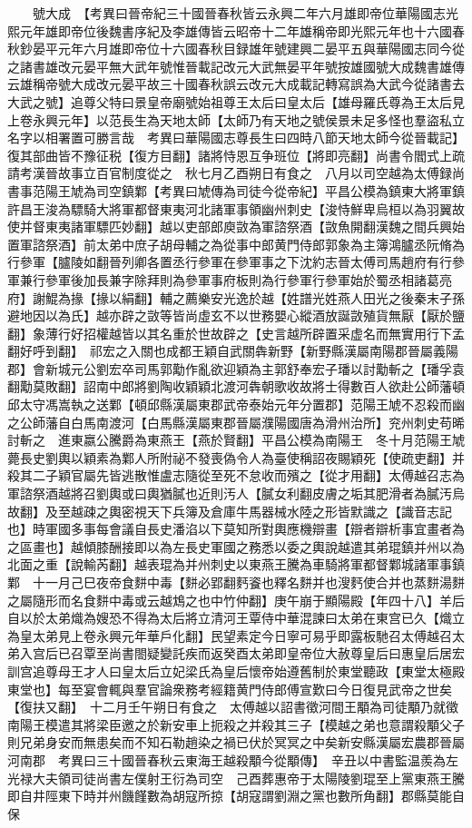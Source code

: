 　　號大成　【考異曰晉帝紀三十國晉春秋皆云永興二年六月雄即帝位華陽國志光熙元年雄即帝位後魏書序紀及李雄傳皆云昭帝十二年雄稱帝即光熙元年也十六國春秋鈔晏平元年六月雄即帝位十六國春秋目録雄年號建興二晏平五與華陽國志同今從之諸書雄改元晏平無大武年號惟晉載記改元大武無晏平年號按雄國號大成魏書雄傳云雄稱帝號大成改元晏平故三十國春秋誤云改元大成載記轉寫誤為大武今從諸書去大武之號】追尊父特曰景皇帝廟號始祖尊王太后曰皇太后【雄母羅氏尊為王太后見上卷永興元年】以范長生為天地太師【太師乃有天地之號侯景未足多怪也羣盜私立名字以相署置可勝言哉　考異曰華陽國志尊長生曰四時八節天地太師今從晉載記】復其部曲皆不豫征税【復方目翻】諸將恃恩互争班位【將即亮翻】尚書令閻式上疏請考漢晉故事立百官制度從之　秋七月乙酉朔日有食之　八月以司空越為太傅録尚書事范陽王虓為司空鎮鄴【考異曰虓傳為司徒今從帝紀】平昌公模為鎮東大將軍鎮許昌王浚為驃騎大將軍都督東夷河北諸軍事領幽州刺史【浚恃鮮卑烏桓以為羽翼故使并督東夷諸軍驃匹妙翻】越以吏部郎庾敳為軍諮祭酒【敳魚開翻漢魏之間兵興始置軍諮祭酒】前太弟中庶子胡母輔之為從事中郎黄門侍郎郭象為主簿鴻臚丞阮脩為行參軍【臚陵如翻晉列卿各置丞行參軍在參軍事之下沈約志晉太傅司馬趙府有行參軍兼行參軍後加長兼字除拜則為參軍事府板則為行參軍行參軍始於蜀丞相諸葛亮府】謝鯤為掾【掾以絹翻】輔之薦樂安光逸於越【姓譜光姓燕人田光之後秦末子孫避地因以為氏】越亦辟之敳等皆尚虛玄不以世務嬰心縱酒放誕敳殖貨無厭【厭於鹽翻】象薄行好招權越皆以其名重於世故辟之【史言越所辟置采虚名而無實用行下孟翻好呼到翻】　祁宏之入關也成都王穎自武關犇新野【新野縣漢屬南陽郡晉屬義陽郡】會新城元公劉宏卒司馬郭勱作亂欲迎穎為主郭舒奉宏子璠以討勱斬之【璠孚袁翻勱莫敗翻】詔南中郎將劉陶收穎穎北渡河犇朝歌收故將士得數百人欲赴公師藩頓邱太守馮嵩執之送鄴【頓邱縣漢屬東郡武帝泰始元年分置郡】范陽王虓不忍殺而幽之公師藩自白馬南渡河【白馬縣漢屬東郡晉屬濮陽國唐為滑州治所】兖州刺史苟晞討斬之　進東嬴公騰爵為東燕王【燕於賢翻】平昌公模為南陽王　冬十月范陽王虓薨長史劉輿以穎素為鄴人所附祕不發喪偽令人為臺使稱詔夜賜穎死【使疏吏翻】并殺其二子穎官屬先皆逃散惟盧志隨從至死不怠收而殯之【從才用翻】太傅越召志為軍諮祭酒越將召劉輿或曰輿猶膩也近則汚人【膩女利翻皮膚之垢其肥滑者為膩汚烏故翻】及至越疎之輿密視天下兵簿及倉庫牛馬器械水陸之形皆默識之【識音志記也】時軍國多事每會議自長史潘淊以下莫知所對輿應機辯畫【辯者辯析事宜畫者為之區畫也】越傾膝酬接即以為左長史軍國之務悉以委之輿說越遣其弟琨鎮并州以為北面之重【說輸芮翻】越表琨為并州刺史以東燕王騰為車騎將軍都督鄴城諸軍事鎮鄴　十一月己巳夜帝食䴵中毒【䴵必郢翻麫餈也釋名䴵并也溲麫使合并也蒸䴵湯䴵之屬隨形而名食䴵中毒或云越鴆之也中竹仲翻】庚午崩于顯陽殿【年四十八】羊后自以於太弟熾為嫂恐不得為太后將立清河王覃侍中華混諫曰太弟在東宫已久【熾立為皇太弟見上卷永興元年華戶化翻】民望素定今日寧可易乎即露板馳召太傅越召太弟入宫后已召覃至尚書閤疑變託疾而返癸酉太弟即皇帝位大赦尊皇后曰惠皇后居宏訓宫追尊母王才人曰皇太后立妃梁氏為皇后懷帝始遵舊制於東堂聽政【東堂太極殿東堂也】每至宴會輒與羣官論衆務考經籍黄門侍郎傅宣歎曰今日復見武帝之世矣【復扶又翻】　十二月壬午朔日有食之　太傅越以詔書徵河間王顒為司徒顒乃就徵南陽王模遣其將梁臣邀之於新安車上扼殺之并殺其三子【模越之弟也意謂殺顒父子則兄弟身安而無患矣而不知石勒趙染之禍已伏於冥冥之中矣新安縣漢屬宏農郡晉屬河南郡　考異曰三十國晉春秋云東海王越殺顒今從顒傳】　辛丑以中書監温羨為左光禄大夫領司徒尚書左僕射王衍為司空　己酉葬惠帝于太陽陵劉琨至上黨東燕王騰即自井陘東下時并州饑饉數為胡寇所掠【胡寇謂劉淵之黨也數所角翻】郡縣莫能自保